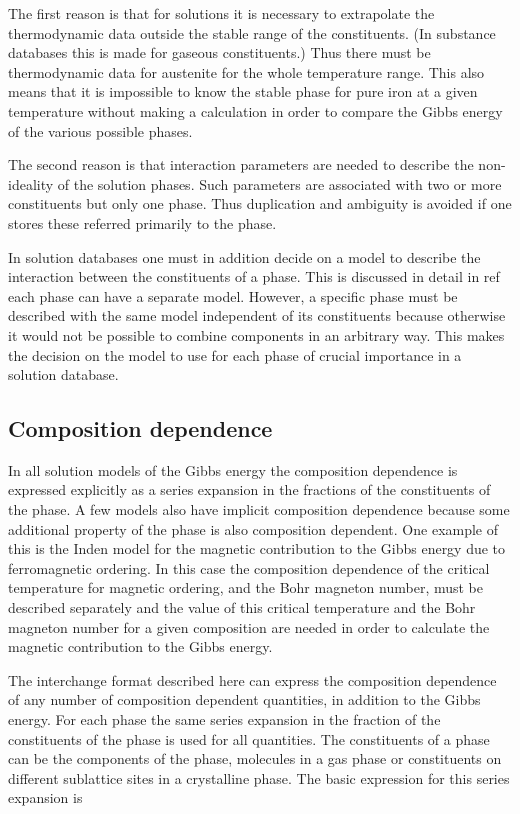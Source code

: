 \documentclass[12pt]{article}
\begin{document}
The first reason is that for solutions it is necessary to extrapolate
the thermodynamic data outside the stable range of the constituents.
(In substance databases this is made for gaseous constituents.) Thus
there must be thermodynamic data for austenite for the whole
temperature range. This also means that it is impossible to know the
stable phase for pure iron at a given temperature without making a
calculation in order to compare the Gibbs energy of the various
possible phases.

The second reason is that interaction parameters are needed to
describe the non-ideality of the solution phases. Such parameters are
associated with two or more constituents but only one phase. Thus
duplication and ambiguity is avoided if one stores these referred
primarily to the phase.

In solution databases one must in addition decide on a model to
describe the interaction between the constituents of a phase. This is
discussed in detail in ref %
each phase can have a separate model. However, a specific phase
must be described with the same model independent of its constituents
because otherwise it would not be possible to combine components in an
arbitrary way. This makes the decision on the model to use for each
phase of crucial importance in a solution database.

\subsection{Composition dependence}\label{sec:tpdep}

In all solution models of the Gibbs energy the composition dependence
is expressed explicitly as a series expansion in the fractions of the
constituents of the phase. A few models also have implicit composition
dependence because some additional property of the phase is also
composition dependent. One example of this is the Inden model for the
magnetic contribution to the Gibbs energy due to ferromagnetic
ordering. In this case the composition dependence of the critical
temperature for magnetic ordering, and the Bohr magneton number, must
be described separately and the value of this critical temperature and
the Bohr magneton number for a given composition are needed in order
to calculate the magnetic contribution to the Gibbs energy.

The interchange format described here can express the composition
dependence of any number of composition dependent quantities, in
addition to the Gibbs energy. For each phase the same series expansion
in the fraction of the constituents of the phase is used for all
quantities. The constituents of a phase can be the components of the
phase, molecules in a gas phase or constituents on different
sublattice sites in a crystalline phase. The basic expression for this
series expansion is
\end{document}
